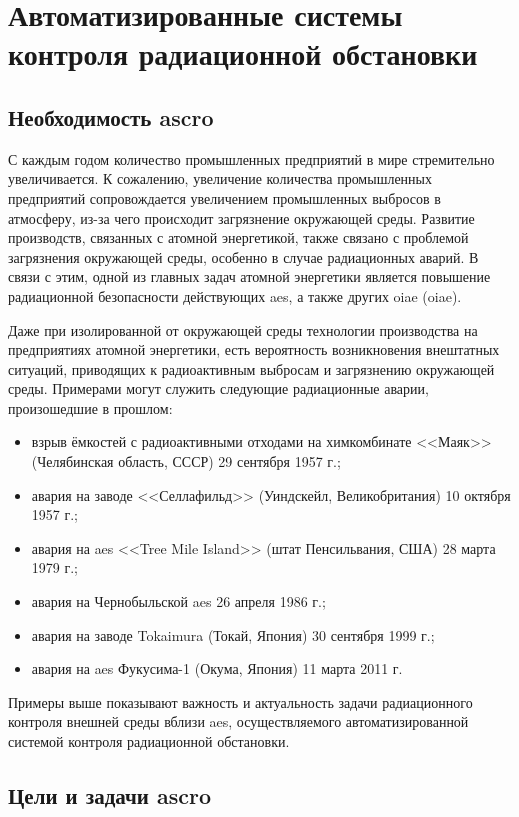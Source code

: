 \chapter{Автоматизированные системы контроля радиационной обстановки}

\section{Необходимость \ac{ascro}}

С каждым годом количество промышленных предприятий в мире стремительно увеличивается. К сожалению, увеличение количества 
промышленных предприятий сопровождается увеличением промышленных выбросов в атмосферу, из-за чего происходит загрязнение 
окружающей среды. Развитие производств, связанных с атомной энергетикой, также связано с проблемой загрязнения 
окружающей среды, особенно в случае радиационных аварий. В связи с этим, одной из главных задач атомной энергетики 
является повышение радиационной безопасности действующих \ac{aes}, а также других \ac{oiae} (\acl{oiae}).

Даже при изолированной от окружающей среды технологии производства на предприятиях атомной энергетики, есть вероятность 
возникновения внештатных ситуаций, приводящих к радиоактивным выбросам и загрязнению окружающей среды. Примерами могут 
служить следующие радиационные аварии, произошедшие в прошлом:

\begin{itemize}
	\item взрыв ёмкостей с радиоактивными отходами на химкомбинате <<Маяк>> (Челябинская область, СССР) 29 сентября 
		1957 г.;
	\item авария на заводе <<Селлафильд>> (Уиндскейл, Великобритания) 10 октября 1957 г.;
	\item авария на \ac{aes} <<Tree Mile Island>> (штат Пенсильвания, США) 28 марта 1979 г.;
	\item авария на Чернобыльской \ac{aes} 26 апреля 1986 г.;
	\item авария на заводе Tokaimura (Токай, Япония) 30 сентября 1999 г.;
	\item авария на \ac{aes} Фукусима-1 (Окума, Япония) 11 марта 2011 г.
\end{itemize}

Примеры выше показывают важность и актуальность задачи радиационного контроля внешней среды вблизи \ac{aes}, 
осуществляемого автоматизированной системой контроля радиационной обстановки. 

\section{Цели и задачи \ac{ascro}}

